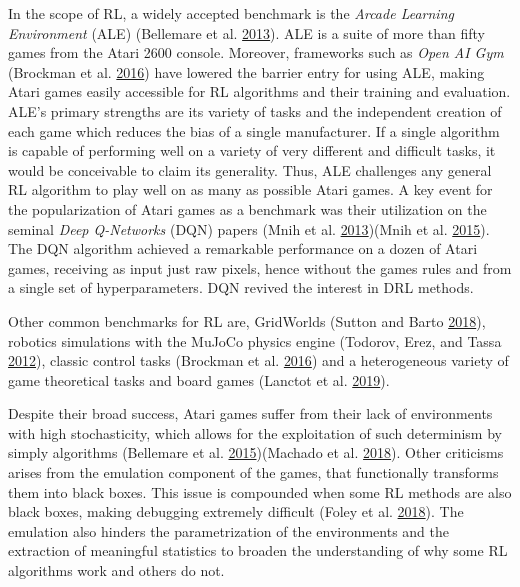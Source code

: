 \documentclass[
  12pt,
  openany]{book}
\begin{document}
In the scope of RL, a widely accepted benchmark is the \emph{Arcade Learning Environment} (ALE) (Bellemare et al. \protect\hyperlink{ref-bellemare2013arcade}{2013}). ALE is a suite of more than fifty games from the Atari 2600 console. Moreover, frameworks such as \emph{Open AI Gym} (Brockman et al. \protect\hyperlink{ref-1606.01540}{2016}) have lowered the barrier entry for using ALE, making Atari games easily accessible for RL algorithms and their training and evaluation. ALE's primary strengths are its variety of tasks and the independent creation of each game which reduces the bias of a single manufacturer. If a single algorithm is capable of performing well on a variety of very different and difficult tasks, it would be conceivable to claim its generality. Thus, ALE challenges any general RL algorithm to play well on as many as possible Atari games. A key event for the popularization of Atari games as a benchmark was their utilization on the seminal \emph{Deep Q-Networks} (DQN) papers (Mnih et al. \protect\hyperlink{ref-mnih2013playing}{2013})(Mnih et al. \protect\hyperlink{ref-mnih2015human}{2015}). The DQN algorithm achieved a remarkable performance on a dozen of Atari games, receiving as input just raw pixels, hence without the games rules and from a single set of hyperparameters. DQN revived the interest in DRL methods.

Other common benchmarks for RL are, GridWorlds (Sutton and Barto \protect\hyperlink{ref-sutton2018reinforcement}{2018}), robotics simulations with the MuJoCo physics engine (Todorov, Erez, and Tassa \protect\hyperlink{ref-todorov2012mujoco}{2012}), classic control tasks (Brockman et al. \protect\hyperlink{ref-1606.01540}{2016}) and a heterogeneous variety of game theoretical tasks and board games (Lanctot et al. \protect\hyperlink{ref-lanctot2019openspiel}{2019}).

Despite their broad success, Atari games suffer from their lack of environments with high stochasticity, which allows for the exploitation of such determinism by simply algorithms (Bellemare et al. \protect\hyperlink{ref-bellemare2015arcade}{2015})(Machado et al. \protect\hyperlink{ref-machado2018revisiting}{2018}). Other criticisms arises from the emulation component of the games, that functionally transforms them into black boxes. This issue is compounded when some RL methods are also black boxes, making debugging extremely difficult (Foley et al. \protect\hyperlink{ref-foley2018toybox}{2018}). The emulation also hinders the parametrization of the environments and the extraction of meaningful statistics to broaden the understanding of why some RL algorithms work and others do not.
\end{document}
